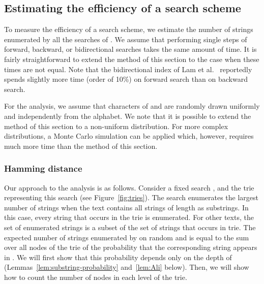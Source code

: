 \documentclass[12pt]{article}
\begin{document}
\subsection{Estimating the efficiency of a search scheme}\label{sec:estimation}
To measure the efficiency of a search scheme, we estimate the number of strings
enumerated by all the searches of .
We assume that performing single steps of
forward, backward, or bidirectional searches takes the same amount of time.
It is fairly straightforward to extend the method of this section to the
case when these times are not equal.
Note that the bidirectional index of Lam et al.~\cite{LamLTWWY09}
reportedly spends slightly more time (order of 10\%) on forward search
than on backward search. 

For the analysis, we assume that characters
of  and  are randomly drawn uniformly and independently
from the alphabet.
We note that it is possible to extend the method of this section to a
non-uniform distribution.
For more complex distributions,
a Monte Carlo simulation can be applied
which, however, 
requires much more time than
the method of this section.

\subsubsection{Hamming distance}\label{sec:hamming-estimation}

Our approach to the analysis is as follows.
Consider a fixed search , and the trie representing this search 
(see Figure~\ref{fig:tries}).
The search enumerates the largest number of strings when
the text contains all strings of length  as substrings.
In this case, every string that occurs in the trie is enumerated.
For other texts, the set of enumerated strings is a subset of the set of strings
that occurs in trie.
The expected number of strings enumerated by  on random  and  is equal
to the sum over all nodes  of the trie of the probability
that the corresponding string appears in .
We will first show that this probability depends only on the depth of 
(Lemmas~\ref{lem:substring-probability} and~\ref{lem:Ali} below).
Then, we will show how to count the number of nodes in each level of the
trie.
\end{document}
